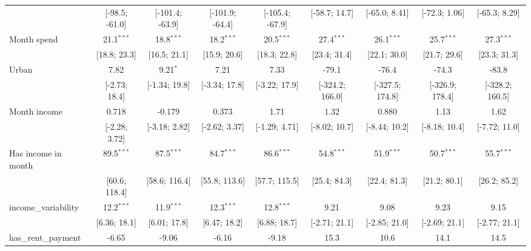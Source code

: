 \begin{table}[htbp]
\begin{threeparttable}[b]
\begin{tabular}{lcccccccc}
                                  & [-98.5; -61.0]  & [-101.4; -63.9] & [-101.9; -64.4] & [-105.4; -67.9] & [-58.7; 14.7]   & [-65.0; 8.41]   & [-72.3; 1.06]   & [-65.3; 8.29]\\   
         Month spend              & 21.1$^{***}$    & 18.8$^{***}$    & 18.2$^{***}$    & 20.5$^{***}$    & 27.4$^{***}$    & 26.1$^{***}$    & 25.7$^{***}$    & 27.3$^{***}$\\   
                                  & [18.8; 23.3]    & [16.5; 21.1]    & [15.9; 20.6]    & [18.3; 22.8]    & [23.4; 31.4]    & [22.1; 30.0]    & [21.7; 29.6]    & [23.3; 31.3]\\   
         Urban                    & 7.82            & 9.21$^{*}$      & 7.21            & 7.33            & -79.1           & -76.4           & -74.3           & -83.8\\   
                                  & [-2.73; 18.4]   & [-1.34; 19.8]   & [-3.34; 17.8]   & [-3.22; 17.9]   & [-324.2; 166.0] & [-327.5; 174.8] & [-326.9; 178.4] & [-328.2; 160.5]\\   
         Month income             & 0.718           & -0.179          & 0.373           & 1.71            & 1.32            & 0.880           & 1.13            & 1.62\\   
                                  & [-2.28; 3.72]   & [-3.18; 2.82]   & [-2.62; 3.37]   & [-1.29; 4.71]   & [-8.02; 10.7]   & [-8.44; 10.2]   & [-8.18; 10.4]   & [-7.72; 11.0]\\   
         Has income in month      & 89.5$^{***}$    & 87.5$^{***}$    & 84.7$^{***}$    & 86.6$^{***}$    & 54.8$^{***}$    & 51.9$^{***}$    & 50.7$^{***}$    & 55.7$^{***}$\\   
                                  & [60.6; 118.4]   & [58.6; 116.4]   & [55.8; 113.6]   & [57.7; 115.5]   & [25.4; 84.3]    & [22.4; 81.3]    & [21.2; 80.1]    & [26.2; 85.2]\\   
         income\_variability      & 12.2$^{***}$    & 11.9$^{***}$    & 12.3$^{***}$    & 12.8$^{***}$    & 9.21            & 9.08            & 9.23            & 9.15\\   
                                  & [6.36; 18.1]    & [6.01; 17.8]    & [6.47; 18.2]    & [6.88; 18.7]    & [-2.71; 21.1]   & [-2.85; 21.0]   & [-2.69; 21.1]   & [-2.77; 21.1]\\   
         has\_rent\_payment       & -6.65           & -9.06           & -6.16           & -9.18           & 15.3            & 10.6            & 14.1            & 14.5\\   

\end{tabular}
\end{threeparttable}
\end{table}
